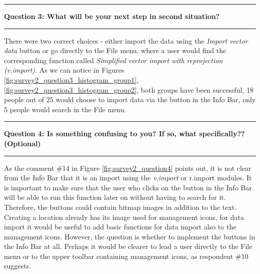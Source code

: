 \documentclass[a4paper,10pt,twoside]{article}
\begin{document}
\newpage
\vspace*{-1cm}
\par\noindent\rule{\textwidth}{0.4pt}
\noindent \textbf{Question 3: What will be your next step in second situation?}
\par\noindent\rule{\textwidth}{0.4pt}

\noindent There were two correct choices - either import the data using the \textit{Import vector data} button or go directly to the File menu, where a user would find the corresponding function called \textit{Simplified vector import with reprojection (v.import)}. As we can notice in Figures \ref{fig:survey2_question3_histogram_group1}, \ref{fig:survey2_question3_histogram_group2}, both groups have been successful, 18 people out of 25 would choose to import data via the button in the Info Bar, only 5 people would search in the File menu.

\par\noindent\rule{\textwidth}{0.4pt}
\noindent \textbf{Question 4: Is something confusing to you? If so, what specifically?? (Optional)}
\par\noindent\rule{\textwidth}{0.4pt}

\noindent As the comment \#14 in Figure \ref{fig:survey2_question4} points out, it is not clear from the Info Bar that it is an import using the \textit{v.import} or {r.import} modules. It is important to make sure that the user who clicks on the button in the Info Bar will be able to run this function later on without having to search for it. Therefore, the buttons could contain bitmap images in addition to the text. Creating a location already has its image used for management icons, for data import it would be useful to add basic functions for data import also to the management icons. However, the question is whether to implement the buttons in the Info Bar at all. Perhaps it would be clearer to lead a user directly to the File menu or to the upper toolbar containing management icons, as respondent \#10 suggests.
\end{document}
